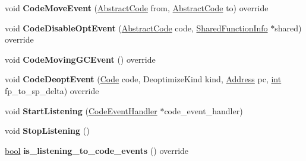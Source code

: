 \begin{DoxyCompactItemize}
\mbox{\label{classv8_1_1internal_1_1ExternalCodeEventListener_a82a4894de3c05619d51d0f4103bef07c}} 
void {\bfseries Code\+Move\+Event} (\mbox{\hyperlink{classv8_1_1internal_1_1AbstractCode}{Abstract\+Code}} from, \mbox{\hyperlink{classv8_1_1internal_1_1AbstractCode}{Abstract\+Code}} to) override
\item 
\mbox{\label{classv8_1_1internal_1_1ExternalCodeEventListener_a656f842b014b9179598047b622b59157}} 
void {\bfseries Code\+Disable\+Opt\+Event} (\mbox{\hyperlink{classv8_1_1internal_1_1AbstractCode}{Abstract\+Code}} code, \mbox{\hyperlink{classv8_1_1internal_1_1SharedFunctionInfo}{Shared\+Function\+Info}} $\ast$shared) override
\item 
\mbox{\label{classv8_1_1internal_1_1ExternalCodeEventListener_afb9fc79c9edc24acf5549e8db9c60d09}} 
void {\bfseries Code\+Moving\+G\+C\+Event} () override
\item 
\mbox{\label{classv8_1_1internal_1_1ExternalCodeEventListener_aad6030f0830af5fe3998f8695f8e0e70}} 
void {\bfseries Code\+Deopt\+Event} (\mbox{\hyperlink{classv8_1_1internal_1_1Code}{Code}} code, Deoptimize\+Kind kind, \mbox{\hyperlink{classuintptr__t}{Address}} pc, \mbox{\hyperlink{classint}{int}} fp\+\_\+to\+\_\+sp\+\_\+delta) override
\item 
\mbox{\label{classv8_1_1internal_1_1ExternalCodeEventListener_a88c0134408bf85cec43c45058872d23b}} 
void {\bfseries Start\+Listening} (\mbox{\hyperlink{classv8_1_1CodeEventHandler}{Code\+Event\+Handler}} $\ast$code\+\_\+event\+\_\+handler)
\item 
\mbox{\label{classv8_1_1internal_1_1ExternalCodeEventListener_ab781bc2611374a07a833776afa77c970}} 
void {\bfseries Stop\+Listening} ()
\item 
\mbox{\label{classv8_1_1internal_1_1ExternalCodeEventListener_a9d014d0003c4db78b900a7e960e4be36}} 
\mbox{\hyperlink{classbool}{bool}} {\bfseries is\+\_\+listening\+\_\+to\+\_\+code\+\_\+events} () override
\end{DoxyCompactItemize}

